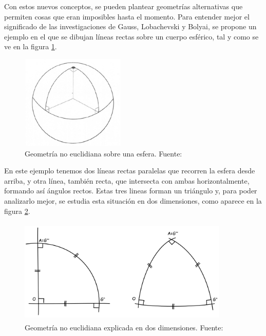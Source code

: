 \documentclass[../main.tex]{subfiles}
\begin{document}
Con estos nuevos conceptos, se pueden plantear geometrías alternativas que permiten cosas que eran imposibles hasta el momento. Para entender mejor el significado de las investigaciones de Gauss, Lobachevski y Bolyai, se propone un ejemplo en el que se dibujan líneas rectas sobre un cuerpo esférico, tal y como se ve en la figura \ref{fig:Triangle_on_Sphere}.

\begin{figure}[htbp]
\centering
\includegraphics[width= 5cm, height= 4.5cm]{imagenes/Triangle_on_Sphere.jpg}
\caption{Geometría no euclidiana sobre una esfera. Fuente:\cite{Triangle_on_Sphere}}
\label{fig:Triangle_on_Sphere}
\end{figure}

En este ejemplo tenemos dos líneas rectas paralelas que recorren la esfera desde arriba, y otra línea, también recta, que intersecta con ambas horizontalmente, formando así ángulos rectos. Estas tres lineas forman un triángulo y, para poder analizarlo mejor, se estudia esta situación en dos dimensiones, como aparece en la figura \ref{fig:Example_2D}.

\begin{figure}[htbp]
\centering
\includegraphics[width= 10cm, height= 5cm]{imagenes/Non_Euclidian_Example_2D.png}
\caption{Geometría no euclidiana explicada en dos dimensiones. Fuente:\cite{Triangle_on_Sphere_2D}}
\label{fig:Example_2D}
\end{figure}
\end{document}
